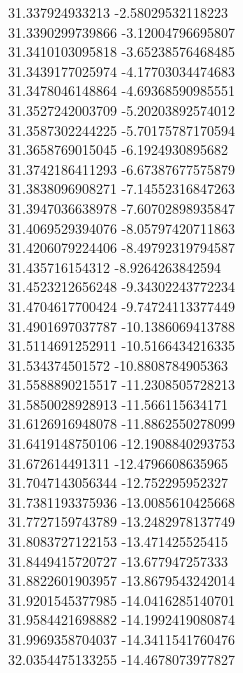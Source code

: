 {31.337924933213	-2.58029532118223\\
31.3390299739866	-3.12004796695807\\
31.3410103095818	-3.65238576468485\\
31.3439177025974	-4.17703034474683\\
31.3478046148864	-4.69368590985551\\
31.3527242003709	-5.20203892574012\\
31.3587302244225	-5.70175787170594\\
31.3658769015045	-6.1924930895682\\
31.3742186411293	-6.67387677575879\\
31.3838096908271	-7.14552316847263\\
31.3947036638978	-7.60702898935847\\
31.4069529394076	-8.05797420711863\\
31.4206079224406	-8.49792319794587\\
31.435716154312	-8.9264263842594\\
31.4523212656248	-9.34302243772234\\
31.4704617700424	-9.74724113377449\\
31.4901697037787	-10.1386069413788\\
31.5114691252911	-10.5166434216335\\
31.534374501572	-10.8808784905363\\
31.5588890215517	-11.2308505728213\\
31.5850028928913	-11.566115634171\\
31.6126916948078	-11.8862550278099\\
31.6419148750106	-12.1908840293753\\
31.672614491311	-12.4796608635965\\
31.7047143056344	-12.752295952327\\
31.7381193375936	-13.0085610425668\\
31.7727159743789	-13.2482978137749\\
31.8083727122153	-13.471425525415\\
31.8449415720727	-13.677947257333\\
31.8822601903957	-13.8679543242014\\
31.9201545377985	-14.0416285140701\\
31.9584421698882	-14.1992419080874\\
31.9969358704037	-14.3411541760476\\
32.0354475133255	-14.4678073977827\\
}
